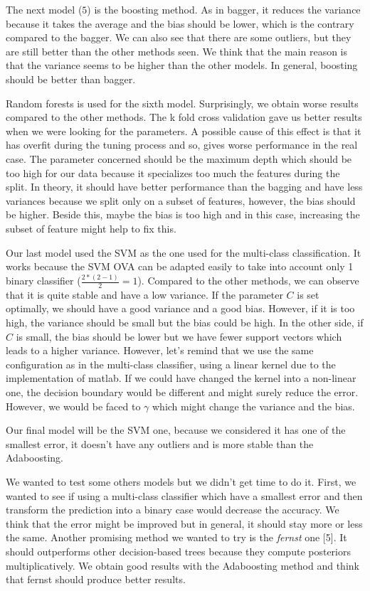 \documentclass{article} %
\begin{document}
The next model ($5$) is the boosting method. As in bagger, it reduces the variance because it takes the average and the bias should be lower, which is the contrary compared to the bagger. We can also see that there are some outliers, but they are still better than the other methods seen. We think that the main reason is that the variance seems to be higher than the other models. In general, boosting should be better than bagger.

Random forests is used for the sixth model. Surprisingly, we obtain worse results compared to the other methods. The k fold cross validation gave us better results when we were looking for the parameters. A possible cause of this effect is that it has overfit during the tuning process and so, gives worse performance in the real case. The parameter concerned should be the maximum depth which should be too high for our data because it specializes too much the features during the split. In theory, it should have better performance than the bagging and have less variances because we split only on a subset of features, however, the bias should be higher. Beside this, maybe the bias is too high and in this case, increasing the subset of feature might help to fix this.

Our last model used the SVM as the one used for the multi-class classification. It works because the SVM OVA can be adapted easily to take into account only 1 binary classifier ($\frac{2*(2-1)}{2}=1$). Compared to the other methods, we can observe that it is quite stable and have a low variance. If the parameter $C$ is set optimally, we should have a good variance and a good bias. However, if it is too high, the variance should be small but the bias could be high. In the other side, if $C$ is small, the bias should be lower but we have fewer support vectors which leads to a higher variance. However, let's remind that we use the same configuration as in the multi-class classifier, using a linear kernel due to the implementation of matlab. If we could have changed the kernel into a non-linear one, the decision boundary would be different and might surely reduce the error. However, we would be faced to $\gamma$ which might change the variance and the bias.

Our final model will be the SVM one, because we considered it has one of the smallest error, it doesn't have any outliers and is more stable than the Adaboosting.

We wanted to test some others models but we didn't get time to do it. First, we wanted to see if using a multi-class classifier which have a smallest error and then transform the prediction into a binary case would decrease the accuracy.  We think that the error might be improved but in general, it should stay more or less the same. Another promising method we wanted to try is the \textit{fernst} one [5]. It should outperforms other decision-based trees because they compute posteriors multiplicatively. We obtain good results with the Adaboosting method and think that fernst should produce better results.
\end{document}

